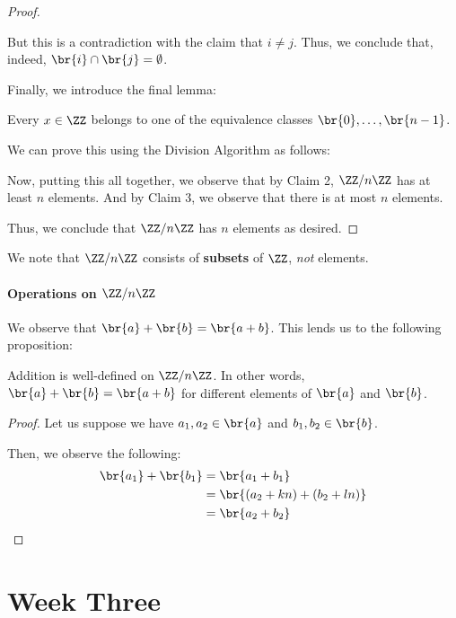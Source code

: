 \documentclass[openany]{book}
\begin{document}
\begin{proof}
\begin{innerproof}
		But this is a contradiction with the claim that $i \neq j$. Thus, we conclude that, indeed, $\br{i} \cap \br{j} = \emptyset$.
	\end{innerproof}
	
	Finally, we introduce the final lemma:
	\begin{lem}
		Every $x \in \ZZ$ belongs to one of the equivalence classes $\br{0}, \ldots, \br{n-1}$.
	\end{lem}
	\begin{innerproof}
		We can prove this using the Division Algorithm as follows:
		
	\end{innerproof}
	
	Now, putting this all together, we observe that by Claim 2, $\ZZ / n \ZZ$ has at least $n$ elements. And by Claim 3, we observe that there is at most $n$ elements.
	
	Thus, we conclude that $\ZZ / n \ZZ$ has $n$ elements as desired.
\end{proof}

\begin{warn}
	We note that $\ZZ/n\ZZ$ consists of \textbf{subsets} of $\ZZ$, \textit{not} elements.
\end{warn}

\subsubsection{Operations on $\ZZ / n \ZZ$}
We observe that $\br{a} + \br{b} = \br{a + b}$. This lends us to the following proposition:
\begin{prop}
	Addition is well-defined on $\ZZ/n \ZZ$. In other words, $\br{a} + \br{b} = \br{a + b}$ for different elements of $\br{a}$ and $\br{b}$.
\end{prop}
\begin{proof}
	Let us suppose we have $a_1, a_2 \in \br{a}$ and $b_1, b_2 \in \br{b}$.
	
	Then, we observe the following:
	\begin{align*}
		\br{a_1} + \br{b_1} &= \br{a_1 + b_1} \\
		&= \br{(a_2 + kn) + (b_2 + ln)} \\
		&= \br{a_2 + b_2}
	\end{align*}
\end{proof}

\chapter{Week Three}
\end{document}
